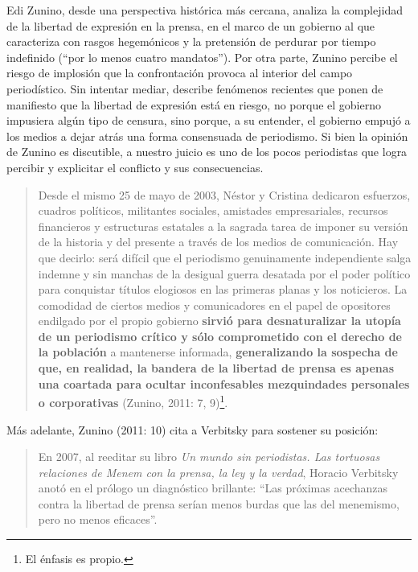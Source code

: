 Edi Zunino, desde una perspectiva histórica más cercana, analiza la complejidad de la libertad de expresión en la prensa, en el marco de un gobierno al que caracteriza con rasgos hegemónicos y la pretensión de perdurar por tiempo indefinido (``por lo menos cuatro mandatos''). Por otra parte, Zunino percibe el riesgo de implosión que la confrontación provoca al interior del campo periodístico. Sin intentar mediar, describe fenómenos recientes que ponen de manifiesto que la libertad de expresión  está en riesgo, no porque el gobierno impusiera algún tipo de censura, sino porque, a su entender, el gobierno empujó a los medios a dejar atrás una forma consensuada de periodismo. Si bien la opinión de Zunino es discutible, a nuestro juicio es uno de los pocos periodistas que logra percibir y explicitar el conflicto y sus consecuencias.

\begin{quote}
Desde el mismo 25 de mayo de 2003, Néstor y Cristina dedicaron esfuerzos, cuadros políticos, militantes sociales, amistades empresariales, recursos financieros y estructuras estatales a la sagrada tarea de imponer su versión de la historia y del presente a través de los medios de comunicación. Hay que decirlo: será difícil que el periodismo genuinamente independiente salga indemne y sin manchas de la desigual guerra desatada por el poder político para conquistar títulos elogiosos en las primeras planas y los noticieros. La comodidad de ciertos medios y comunicadores en el papel de opositores endilgado por el propio gobierno \textbf{sirvió para desnaturalizar la utopía de un periodismo crítico y sólo comprometido con el derecho de la población} a mantenerse informada, \textbf{generalizando la sospecha de que, en realidad, la bandera de la libertad de prensa es apenas una coartada para ocultar inconfesables mezquindades personales o corporativas} (Zunino, 2011: 7, 9)\footnote{El énfasis es propio.}.
\end{quote}

Más adelante, Zunino (2011: 10) cita a Verbitsky para sostener su posición:

\begin{quote}
En 2007, al reeditar su libro \emph{Un mundo sin periodistas. Las tortuosas relaciones de Menem con la prensa, la ley y la verdad}, Horacio Verbitsky anotó en el prólogo un diagnóstico brillante: ``Las próximas acechanzas contra la libertad de prensa serían menos burdas que las del menemismo, pero no menos eficaces''.
\end{quote}

